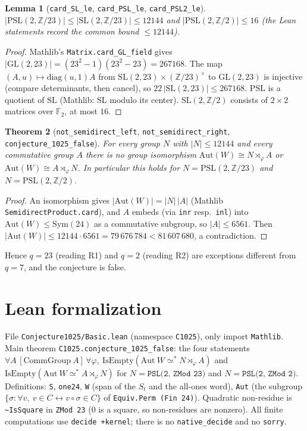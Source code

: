 \documentclass[11pt]{article}
\newtheorem{theorem}{Theorem}
\newtheorem{lemma}[theorem]{Lemma}
\begin{document}
\begin{lemma}[\texttt{card\_SL\_le}, \texttt{card\_PSL\_le}, \texttt{card\_PSL2\_le}]
$|\mathrm{PSL}(2,\mathbb{Z}/23)|\le|\mathrm{SL}(2,\mathbb{Z}/23)|\le 12144$ and $|\mathrm{PSL}(2,\mathbb{Z}/2)|\le 16$ (the Lean statements record the common bound $\le 12144$).
\end{lemma}
\begin{proof}
Mathlib's \texttt{Matrix.card\_GL\_field} gives $|\mathrm{GL}(2,23)| = (23^2-1)(23^2-23) = 267168$. The map
$(A,u)\mapsto \mathrm{diag}(u,1)A$ from $\mathrm{SL}(2,23)\times(\mathbb{Z}/23)^\times$ to $\mathrm{GL}(2,23)$ is
injective (compare determinants, then cancel), so $22\,|\mathrm{SL}(2,23)|\le 267168$. $\mathrm{PSL}$ is a quotient of
$\mathrm{SL}$ (Mathlib: $\mathrm{SL}$ modulo its center). $\mathrm{SL}(2,\mathbb{Z}/2)$ consists of $2\times2$ matrices
over $\mathbb{F}_2$, at most $16$.
\end{proof}

\begin{theorem}[\texttt{not\_semidirect\_left}, \texttt{not\_semidirect\_right}, \texttt{conjecture\_1025\_false}]
For every group $N$ with $|N|\le 12144$ and every commutative group $A$ there is no group isomorphism
$\mathrm{Aut}(W)\cong N\rtimes_\varphi A$ or $\mathrm{Aut}(W)\cong A\rtimes_\varphi N$. In particular this holds for
$N=\mathrm{PSL}(2,\mathbb{Z}/23)$ and $N = \mathrm{PSL}(2,\mathbb{Z}/2)$.
\end{theorem}
\begin{proof}
An isomorphism gives $|\mathrm{Aut}(W)| = |N|\,|A|$ (Mathlib \texttt{SemidirectProduct.card}), and $A$ embeds
(via \texttt{inr} resp.\ \texttt{inl}) into $\mathrm{Aut}(W)\le \mathrm{Sym}(24)$ as a commutative subgroup, so
$|A|\le 6561$. Then $|\mathrm{Aut}(W)|\le 12144\cdot 6561 = 79\,676\,784 < 81\,607\,680$, a contradiction.
\end{proof}
Hence $q = 23$ (reading R1) and $q = 2$ (reading R2) are exceptions different from $q=7$, and the conjecture is false.

\section*{Lean formalization}
File \texttt{Conjecture1025/Basic.lean} (namespace \texttt{C1025}), only import \texttt{Mathlib}. Main theorem
\texttt{C1025.conjecture\_1025\_false}: the four statements
$\forall A\,[\mathrm{CommGroup}\ A]\,\forall\varphi,\ \mathrm{IsEmpty}(\mathrm{Aut}\ W \simeq^* N\rtimes_\varphi A)$ and
$\mathrm{IsEmpty}(\mathrm{Aut}\ W \simeq^* A\rtimes_\varphi N)$ for $N = \texttt{PSL(2, ZMod 23)}$ and
$N=\texttt{PSL(2, ZMod 2)}$. Definitions: \texttt{S}, \texttt{one24}, \texttt{W} (span of the $S_t$ and the all-ones
word), \texttt{Aut} (the subgroup $\{\sigma : \forall v,\ v\in C \leftrightarrow v\circ\sigma\in C\}$ of
\texttt{Equiv.Perm (Fin 24)}). Quadratic non-residue is \texttt{\textasciitilde IsSquare} in \texttt{ZMod 23}
(0 is a square, so non-residues are nonzero). All finite computations use \texttt{decide +kernel}; there is no
\texttt{native\_decide} and no \texttt{sorry}.
\end{document}
